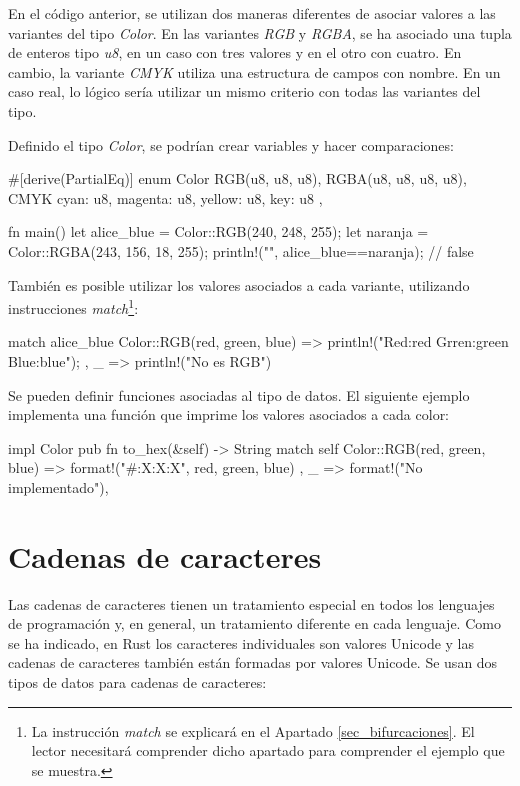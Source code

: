 En el código anterior, se utilizan dos maneras diferentes de asociar valores a las variantes del tipo \textit{Color}. En las variantes \textit{RGB} y \textit{RGBA}, se ha asociado una tupla de enteros tipo \textit{u8}, en un caso con tres valores y en el otro con cuatro. En cambio, la variante \textit{CMYK} utiliza una estructura de campos con nombre. En un caso real, lo lógico sería utilizar un mismo criterio con todas las variantes del tipo.

Definido el tipo \textit{Color}, se podrían crear variables y hacer comparaciones:

\vspace{0.7em}
\begin{Codigo}
#[derive(PartialEq)]
enum Color {
   RGB(u8, u8, u8),
   RGBA(u8, u8, u8, u8),
   CMYK { cyan: u8, magenta: u8, yellow: u8, key: u8 },
}

fn main() {
   let alice_blue = Color::RGB(240, 248, 255);
   let naranja = Color::RGBA(243, 156, 18, 255);
   println!("{}", alice_blue==naranja); // false
}
\end{Codigo}

\vfill\null

También es posible utilizar los valores asociados a cada variante, utilizando instrucciones \textit{match}\footnote{La instrucción \textit{match} se explicará en el Apartado \ref{sec_bifurcaciones}. El lector necesitará comprender dicho apartado para comprender el ejemplo que se muestra.}:

\vspace{0.7em}
\begin{Codigo}
match alice_blue {
   Color::RGB(red, green, blue) => {
      println!("Red:{red} Grren:{green} Blue:{blue}");
   },
   _ => println!("No es RGB")
}
\end{Codigo}

Se pueden definir funciones asociadas al tipo de datos. El siguiente ejemplo implementa una función que imprime los valores asociados a cada color:

\vspace{0.7em}
\begin{Codigo}
impl Color {
   pub fn to_hex(&self) -> String {
      match self {
         Color::RGB(red, green, blue) => {
            format!("#{:X}{:X}{:X}", red, green, blue)
         },
         _ => format!("No implementado"),
      }
   }
}
\end{Codigo}

\section{Cadenas de caracteres}
\noindent Las cadenas de caracteres tienen un tratamiento especial en todos los lenguajes de programación y, en general, un tratamiento diferente en cada lenguaje. Como se ha indicado, en Rust los caracteres individuales son valores Unicode y las cadenas de caracteres también están formadas por valores Unicode. Se usan dos tipos de datos para cadenas de caracteres:

